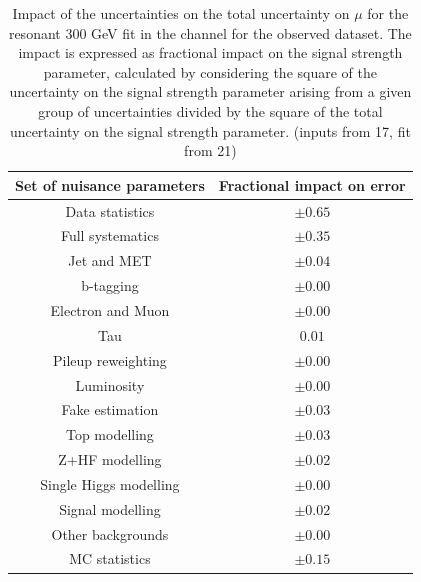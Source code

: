 \begin{table}
\centering
\begin{tabular}{|c|c|}
\hline
Set of nuisance parameters & Fractional impact on error\\
\hline
Data statistics & $\pm 0.65$\\
Full systematics & $\pm 0.35$\\
Jet and MET & $\pm 0.04$ \\
b-tagging & $\pm 0.00$\\
Electron and Muon & $\pm 0.00$\\
Tau & $0.01$\\
Pileup reweighting & $\pm 0.00$\\
Luminosity & $\pm 0.00$\\
Fake estimation & $\pm 0.03$\\
Top modelling & $\pm 0.03$\\ 
Z+HF modelling & $\pm 0.02$\\
Single Higgs modelling & $\pm 0.00$\\
Signal modelling & $\pm 0.02$\\
Other backgrounds & $\pm 0.00$\\
MC statistics & $\pm 0.15$\\
\hline
\end{tabular}
\caption{Impact of the uncertainties on the total uncertainty on $\mu$ for the resonant 300 GeV fit in the \hadhad channel for the observed dataset. The impact is expressed as fractional impact on the signal strength parameter,  calculated by considering the square of the uncertainty on the signal strength parameter arising from a given group of uncertainties divided by the square of the total uncertainty on the signal strength parameter.  (inputs from 17, fit from 21)}
\label{sec:fit:tab:HadHadBreakdown2HDM300Observed}
\end{table}

